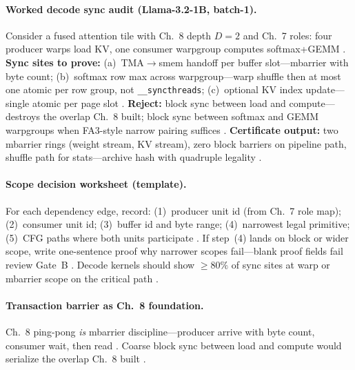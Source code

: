 \paragraph{Worked decode sync audit (Llama-3.2-1B, batch-1).}
Consider a fused attention tile with Ch.~8 depth $D{=}2$ and Ch.~7 roles: four producer warps load KV, one consumer warpgroup computes softmax+GEMM \citep{shah2024flashattention3,kwon2023vllm}.
\textbf{Sync sites to prove:} (a)~TMA$\rightarrow$smem handoff per buffer slot---mbarrier with byte count; (b)~softmax row max across warpgroup---warp shuffle then at most one atomic per row group, not \texttt{\_\_syncthreads}; (c)~optional KV index update---single atomic per page slot \citep{dao2022flashattention,patel2025llminference}.
\textbf{Reject:} block sync between load and compute---destroys the overlap Ch.~8 built; block sync between softmax and GEMM warpgroups when FA3-style narrow pairing suffices \citep{shah2024flashattention3,semianalysis2024tma}.
\textbf{Certificate output:} two mbarrier rings (weight stream, KV stream), zero block barriers on pipeline path, shuffle path for stats---archive hash with quadruple legality \citep{yirage2026,chen2020compilerbasedhardw}.

\paragraph{Scope decision worksheet (template).}
For each dependency edge, record: (1)~producer unit id (from Ch.~7 role map); (2)~consumer unit id; (3)~buffer id and byte range; (4)~narrowest legal primitive; (5)~CFG paths where both units participate \citep{yirage2026,mpk2025}.
If step~(4) lands on block or wider scope, write one-sentence proof why narrower scopes fail---blank proof fields fail review Gate~B \citep{chen2020compilerbasedhardw,taxbreak2026}.
Decode kernels should show ${\geq}80\%$ of sync sites at warp or mbarrier scope on the critical path \citep{patel2025llminference,memoryfloor2026}.

\paragraph{Transaction barrier as Ch.~8 foundation.}
Ch.~8 ping-pong \emph{is} mbarrier discipline---producer arrive with byte count, consumer wait, then read \citep{shah2024flashattention3,semianalysis2024tma,nvidia2022hopper}.
Coarse block sync between load and compute would serialize the overlap Ch.~8 built \citep{dao2022flashattention,yirage2026}.


